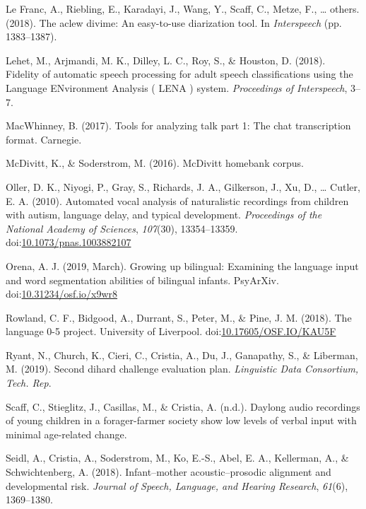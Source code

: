 \documentclass[english,table,man,floatsintext]{apa6}
\begin{document}
\leavevmode\hypertarget{ref-le2018aclew}{}%
Le Franc, A., Riebling, E., Karadayi, J., Wang, Y., Scaff, C., Metze, F., \ldots{} others. (2018). The aclew divime: An easy-to-use diarization tool. In \emph{Interspeech} (pp. 1383--1387).

\leavevmode\hypertarget{ref-Lehet2018}{}%
Lehet, M., Arjmandi, M. K., Dilley, L. C., Roy, S., \& Houston, D. (2018). Fidelity of automatic speech processing for adult speech classifications using the Language ENvironment Analysis ( LENA ) system. \emph{Proceedings of Interspeech}, 3--7.

\leavevmode\hypertarget{ref-macwhinney2017tools}{}%
MacWhinney, B. (2017). Tools for analyzing talk part 1: The chat transcription format. Carnegie.

\leavevmode\hypertarget{ref-mcdivitt2016mcdivitt}{}%
McDivitt, K., \& Soderstrom, M. (2016). McDivitt homebank corpus.

\leavevmode\hypertarget{ref-Oller}{}%
Oller, D. K., Niyogi, P., Gray, S., Richards, J. A., Gilkerson, J., Xu, D., \ldots{} Cutler, E. A. (2010). Automated vocal analysis of naturalistic recordings from children with autism, language delay, and typical development. \emph{Proceedings of the National Academy of Sciences}, \emph{107}(30), 13354--13359. doi:\href{https://doi.org/10.1073/pnas.1003882107}{10.1073/pnas.1003882107}

\leavevmode\hypertarget{ref-orena_2019}{}%
Orena, A. J. (2019, March). Growing up bilingual: Examining the language input and word segmentation abilities of bilingual infants. PsyArXiv. doi:\href{https://doi.org/10.31234/osf.io/x9wr8}{10.31234/osf.io/x9wr8}

\leavevmode\hypertarget{ref-rowland2018}{}%
Rowland, C. F., Bidgood, A., Durrant, S., Peter, M., \& Pine, J. M. (2018). The language 0-5 project. University of Liverpool. doi:\href{https://doi.org/10.17605/OSF.IO/KAU5F}{10.17605/OSF.IO/KAU5F}

\leavevmode\hypertarget{ref-ryant2019second}{}%
Ryant, N., Church, K., Cieri, C., Cristia, A., Du, J., Ganapathy, S., \& Liberman, M. (2019). Second dihard challenge evaluation plan. \emph{Linguistic Data Consortium, Tech. Rep}.

\leavevmode\hypertarget{ref-scaff}{}%
Scaff, C., Stieglitz, J., Casillas, M., \& Cristia, A. (n.d.). Daylong audio recordings of young children in a forager-farmer society show low levels of verbal input with minimal age-related change.

\leavevmode\hypertarget{ref-Seidl2018}{}%
Seidl, A., Cristia, A., Soderstrom, M., Ko, E.-S., Abel, E. A., Kellerman, A., \& Schwichtenberg, A. (2018). Infant--mother acoustic--prosodic alignment and developmental risk. \emph{Journal of Speech, Language, and Hearing Research}, \emph{61}(6), 1369--1380.
\end{document}
